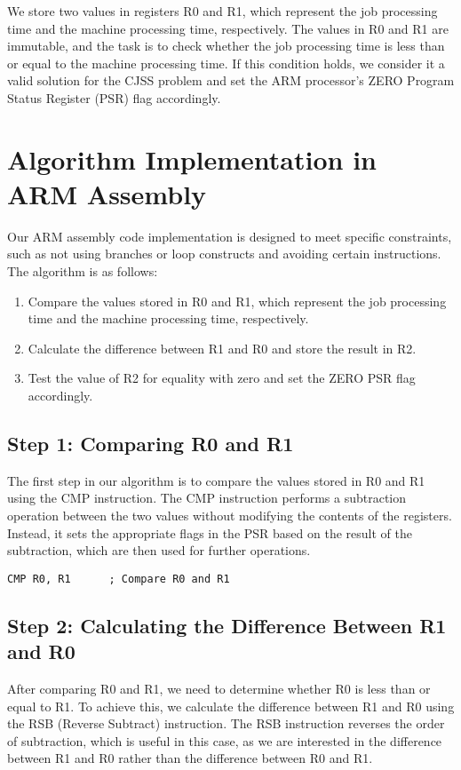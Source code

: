 We store two values in registers R0 and R1, which represent the job processing time and the machine processing time, respectively. The values in R0 and R1 are immutable, and the task is to check whether the job processing time is less than or equal to the machine processing time. If this condition holds, we consider it a valid solution for the CJSS problem and set the ARM processor's ZERO Program Status Register (PSR) flag accordingly.

\section{Algorithm Implementation in ARM Assembly}

Our ARM assembly code implementation is designed to meet specific constraints, such as not using branches or loop constructs and avoiding certain instructions. The algorithm is as follows:

\begin{enumerate}
  \item Compare the values stored in R0 and R1, which represent the job processing time and the machine processing time, respectively.
  \item Calculate the difference between R1 and R0 and store the result in R2.
  \item Test the value of R2 for equality with zero and set the ZERO PSR flag accordingly.
\end{enumerate}

\subsection{Step 1: Comparing R0 and R1}
The first step in our algorithm is to compare the values stored in R0 and R1 using the CMP instruction. The CMP instruction performs a subtraction operation between the two values without modifying the contents of the registers. Instead, it sets the appropriate flags in the PSR based on the result of the subtraction, which are then used for further operations.

\begin{verbatim}
CMP R0, R1      ; Compare R0 and R1
\end{verbatim}

\subsection{Step 2: Calculating the Difference Between R1 and R0}
After comparing R0 and R1, we need to determine whether R0 is less than or equal to R1. To achieve this, we calculate the difference between R1 and R0 using the RSB (Reverse Subtract) instruction. The RSB instruction reverses the order of subtraction, which is useful in this case, as we are interested in the difference between R1 and R0 rather than the difference between R0 and R1.

